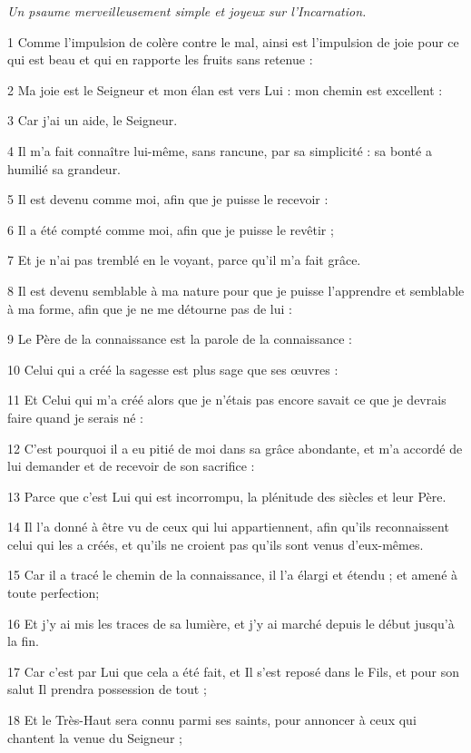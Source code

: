 \par \textit{Un psaume merveilleusement simple et joyeux sur l'Incarnation.}

\par 1 Comme l'impulsion de colère contre le mal, ainsi est l'impulsion de joie pour ce qui est beau et qui en rapporte les fruits sans retenue :
\par 2 Ma joie est le Seigneur et mon élan est vers Lui : mon chemin est excellent :
\par 3 Car j'ai un aide, le Seigneur.
\par 4 Il m'a fait connaître lui-même, sans rancune, par sa simplicité : sa bonté a humilié sa grandeur.
\par 5 Il est devenu comme moi, afin que je puisse le recevoir :
\par 6 Il a été compté comme moi, afin que je puisse le revêtir ;
\par 7 Et je n'ai pas tremblé en le voyant, parce qu'il m'a fait grâce.
\par 8 Il est devenu semblable à ma nature pour que je puisse l'apprendre et semblable à ma forme, afin que je ne me détourne pas de lui :
\par 9 Le Père de la connaissance est la parole de la connaissance :
\par 10 Celui qui a créé la sagesse est plus sage que ses œuvres :
\par 11 Et Celui qui m'a créé alors que je n'étais pas encore savait ce que je devrais faire quand je serais né :
\par 12 C'est pourquoi il a eu pitié de moi dans sa grâce abondante, et m'a accordé de lui demander et de recevoir de son sacrifice :
\par 13 Parce que c'est Lui qui est incorrompu, la plénitude des siècles et leur Père.
\par 14 Il l'a donné à être vu de ceux qui lui appartiennent, afin qu'ils reconnaissent celui qui les a créés, et qu'ils ne croient pas qu'ils sont venus d'eux-mêmes.
\par 15 Car il a tracé le chemin de la connaissance, il l'a élargi et étendu ; et amené à toute perfection;
\par 16 Et j'y ai mis les traces de sa lumière, et j'y ai marché depuis le début jusqu'à la fin.
\par 17 Car c'est par Lui que cela a été fait, et Il s'est reposé dans le Fils, et pour son salut Il prendra possession de tout ;
\par 18 Et le Très-Haut sera connu parmi ses saints, pour annoncer à ceux qui chantent la venue du Seigneur ;
